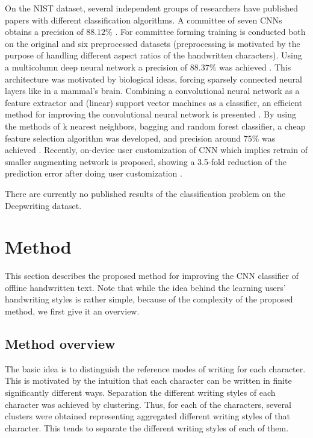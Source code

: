\documentclass{article}
\begin{document}
On the NIST dataset, several independent groups of researchers have published papers with different classification algorithms.
A committee of seven CNNs obtains a precision of $88.12\%$ \citep{nist1}.
For committee forming training is conducted both on the original and six preprocessed datasets
(preprocessing is motivated by the purpose of handling different aspect ratios of the handwritten characters).
Using a multicolumn deep neural network a precision of $88.37\%$ was achieved \citep{nist2}.
This architecture was motivated by biological ideas, forcing sparsely connected neural layers like in a mammal's brain.
Combining a convolutional neural network as a feature extractor and (linear) support vector machines as a classifier,
an efficient method for improving the convolutional neural network is presented \citep{nist3}.
By using the methods of k nearest neighbors, bagging and random forest classifier, a cheap feature selection algorithm was developed,
and precision around $75\%$ was achieved \citep{nist4}.
Recently, on-device user customization of CNN which implies retrain of smaller augmenting network is proposed,
showing a 3.5-fold reduction of the prediction error after doing user customization \citep{nist5}.

There are currently no published results of the classification problem on the Deepwriting dataset.

\section{Method}

This section describes the proposed method for improving the CNN classifier of offline handwritten text.
Note that while the idea behind the learning users' handwriting styles is rather simple, because of the complexity of the proposed method, we first give it an overview. 

\subsection{Method overview}

The basic idea is to distinguish the reference modes %
of writing for each character.
This is motivated by the intuition that each character can be written in finite significantly different ways.
Separation the different writing styles of each character was achieved by clustering.
Thus, for each of the characters, several clusters were obtained representing aggregated different writing styles of that character.
This tends to separate the different writing styles of each of them.
\end{document}
